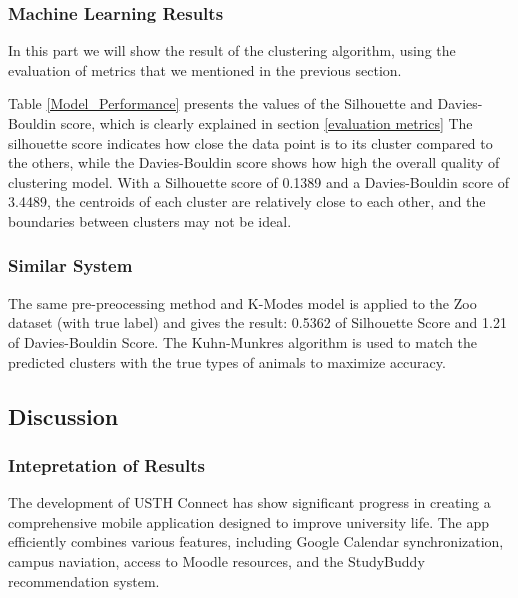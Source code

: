 \documentclass[12pt]{article}
\makeatletter
\newcommand\subsubsubsection{\@startsection{paragraph}{4}{\z@}{-2.5ex\@plus -1ex \@minus -.25ex}{1.25ex \@plus .25ex}{\normalfont\normalsize\bfseries}}
\makeatother
\begin{document}
\subsubsection{Machine Learning Results}
In this part we will show the result of the clustering algorithm, using the evaluation of
metrics that we mentioned in the previous section.

\subsubsubsection{Model Performance}

\begin{table}[H]
\centering
{}
\caption{Model Performance}
\label{Model_Performance}
\end{table}

Table \ref{Model_Performance} presents the values of the Silhouette and Davies-Bouldin score, which is clearly explained in section \ref{evaluation metrics} The silhouette score indicates how close the data point is to its cluster compared to the others, while the Davies-Bouldin score shows how high the overall quality of clustering model. With a Silhouette score of 0.1389 and a Davies-Bouldin score of 3.4489, the centroids of each cluster are relatively close to each other, and the boundaries between clusters may not be ideal.

\subsubsection{Similar System}
The same pre-preocessing method and K-Modes model is applied to the Zoo dataset (with true label) and gives the result: 0.5362 of Silhouette Score and 1.21 of Davies-Bouldin Score. The Kuhn-Munkres\citep{zhu2011efficient} algorithm is used to match the predicted clusters with the true types of animals to maximize accuracy.

\subsection{Discussion}
\subsubsection{Intepretation of Results}
The development of USTH Connect has show significant progress in creating a comprehensive mobile application designed to improve university life.
The app efficiently combines various features, including Google Calendar synchronization, campus naviation, access to Moodle resources, and the StudyBuddy recommendation system.
\end{document}
